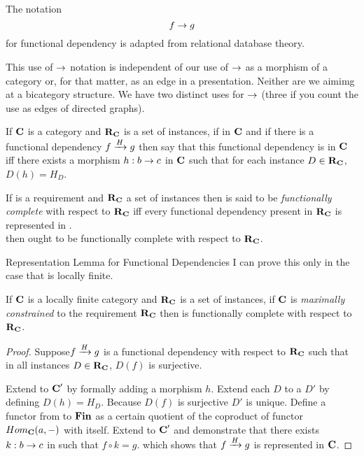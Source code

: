 \begin{frame}
The notation 
$$
f \morph g
$$
for functional dependency is adapted from relational database theory. 

This use of $\morph$ notation is independent of our use of $\morph$ as a morphism of a category 
or, for that matter, as an edge in a presentation. Neither are we aimimg at a bicategory structure. 
We have two distinct uses for $\morph$ (three if you count the use as edges of directed graphs). 
\end{frame}

\begin{frame}
\begin{definition}
If $\catc$ is a category and $\reqtc$ is a set of instances, 
if \fgsourcediagram in $\catc$ 
and if there is a functional dependency $\fundep{H}{f}{g}$ then say that 
this functional dependency  is  in $\catc$ 
iff there exists a morphism $h:b \morph c$ in $\catc$ such that for each instance $D \in \reqtc$, $D(h)=H_D$.
\end{definition}
\medskip
If \catcw is a requirement and $\reqtc$ a set of instances then \catcw is said to be 
\textit{functionally complete} with respect to $\reqtc$ iff every functional dependency
present in $\reqtc$ is represented in \catc.\\
\medskip
{}\IfSforCwithRCwords then \catcw ought to be functionally complete with respect to $\reqtc$.
\end{frame}

\begin{frame}{Representation Lemma for Functional Dependencies}
I can prove this only in the case that \catcw is locally finite.

\begin{lemma}
If $\catc$ is a locally finite category and $\reqtc$ is a set of instances, if $\catc$ is 
\textit{maximally constrained} to the requirement $\reqtc$ then 
\catcw is functionally complete with respect to $\reqtc$.
\end{lemma}
\begin{proof}
Suppose$\fundep{H}{f}{g}$  is a functional dependency with respect to $\reqtc$
such that in all instances $D \in \reqtc$, $D(f)$ is surjective.

Extend \catcw to $\catcp$ by formally adding a morphism $h$. Extend each $D$ to a $D'$ by defining $D(h)=H_D$. 
Because $D(f)$ is surjective $D'$ is unique. 
Define a functor from \catcw to $\Fin$ as  a certain quotient of the coproduct of functor $Hom_{\catc}(a,-)$ with itself. 
Extend to $\catcp$ and demonstrate that there exists $k:b \morph c$ in \catcw such that $f \circ k=g$. 
which shows that $\fundep{H}{f}{g}$ is represented in $\catc$.
\end{proof}
\end{frame}

